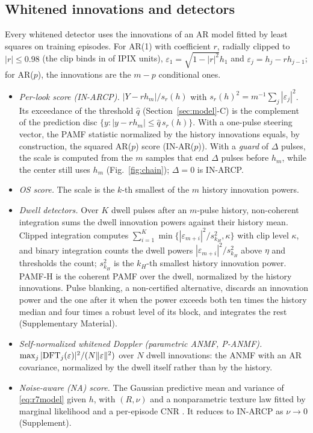\documentclass[journal]{IEEEtran}
\begin{document}
\subsection{Whitened innovations and detectors}
Every whitened detector uses the innovations of an AR model fitted by least squares on training episodes. For AR(1) with coefficient $r$, radially clipped to $|r|\le0.98$ (the clip binds in \FitClampBinding{} of \NUnitsConf{} IPIX units), $\varepsilon_1=\sqrt{1-|r|^2}h_1$ and $\varepsilon_j=h_j-rh_{j-1}$; for AR($p$), the innovations are the $m-p$ conditional ones.
\begin{itemize}[leftmargin=*,itemsep=1pt]
\item \emph{Per-look score (IN-ARCP).} $|Y-rh_m|/s_r(h)$ with $s_r(h)^2=m^{-1}\sum_j|\varepsilon_j|^2$. Its exceedance of the threshold $\widehat q$ (Section~\ref{sec:model}-C) is the complement of the prediction disc $\{y:|y-rh_m|\le\widehat q\,s_r(h)\}$. With a one-pulse steering vector, the PAMF statistic normalized by the history innovations equals, by construction, the squared AR($p$) score (IN-AR($p$)). With a \emph{guard} of $\Delta$ pulses, the scale is computed from the $m$ samples that end $\Delta$ pulses before $h_m$, while the center still uses $h_m$ (Fig.~\ref{fig:chain}); $\Delta=0$ is IN-ARCP.
\item \emph{OS score.} The scale is the $k$-th smallest of the $m$ history innovation powers.
\item \emph{Dwell detectors.} Over $K$ dwell pulses after an $m$-pulse history, non-coherent integration sums the dwell innovation powers against their history mean. Clipped integration computes $\sum_{i=1}^K\min\{|\varepsilon_{m+i}|^2/s_{k_H}^2,\kappa\}$ with clip level $\kappa$, and binary integration counts the dwell powers $|\varepsilon_{m+i}|^2/s_{k_H}^2$ above $\eta$ and thresholds the count; $s_{k_H}^2$ is the $k_H$-th smallest history innovation power. PAMF-H is the coherent PAMF over the dwell, normalized by the history innovations. Pulse blanking, a non-certified alternative, discards an innovation power and the one after it when the power exceeds both ten times the history median and four times a robust level of its block, and integrates the rest (Supplementary Material).
\item \emph{Self-normalized whitened Doppler (parametric ANMF, P-ANMF).} $\max_j|{\rm DFT}_j(\varepsilon)|^2/(N\|\varepsilon\|^2)$ over $N$ dwell innovations: the ANMF with an AR covariance, normalized by the dwell itself rather than by the history.
\item \emph{Noise-aware (NA) score.} The Gaussian predictive mean and variance of \eqref{eq:r7model} given $h$, with $(R,\nu)$ and a nonparametric texture law fitted by marginal likelihood and a per-episode CNR \cite{ignatiadis2025}. It reduces to IN-ARCP as $\nu\to0$ (Supplement).
\end{itemize}
\end{document}
